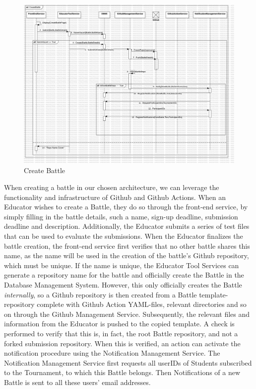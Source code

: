\begin{figure}[H]
    \centering
    \includegraphics[width=\textwidth]{Graphics/Sequence Diagrams/CreateBattle.png}
    \caption{Create Battle}
    \label{fig:createbattle}
\end{figure}
When creating a battle in our chosen architecture, we can leverage the functionality and infrastructure of Github and Github Actions. When an Educator wishes to create a Battle, they do so through the front-end service, by simply filling in the battle details, such a name, sign-up deadline, submission deadline and description. Additionally, the Educator submits a series of test files that can be used to evaluate the submissions. When the Educator finalizes the battle creation, the front-end service first verifies that no other battle shares this name, as the name will be used in the creation of the battle's Github repository, which must be unique. If the name is unique, the Educator Tool Services can generate a repository name for the battle and officially create the Battle in the Database Management System. However, this only officially creates the Battle \textit{internally}, so a Github repository is then created from a Battle template-repository complete with Github Action YAML-files, relevant directories and so on through the Github Management Service. Subsequently, the relevant files and information from the Educator is pushed to the copied template. A check is performed to verify that this is, in fact, the root Battle repository, and not a forked submission repository. When this is verified, an action can activate the notification procedure using the Notification Management Service. The Notification Management Service first requests all userIDs of Students subscribed to the Tournament, to which this Battle belongs. Then Notifications of a new Battle is sent to all these users' email addresses.  


